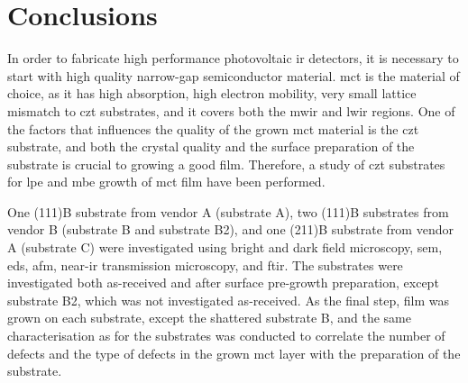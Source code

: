 \chapter{Conclusions}\label{ch:conclusion}

In order to fabricate high performance photovoltaic \ac{ir} detectors, it is necessary to start with high quality narrow-gap semiconductor material. \Ac{mct} is the material of choice, as it has high absorption, high electron mobility, very small lattice mismatch 
to \ac{czt} substrates, and it covers both the \ac{mwir} and \ac{lwir} regions. One of the factors that influences the quality of the grown \ac{mct} material is the \ac{czt} substrate, and both the crystal quality and the surface preparation of the substrate is crucial to growing a good film. Therefore, a study of \ac{czt} substrates for \ac{lpe} and \ac{mbe} growth of \ac{mct} film have been performed.

One (111)B substrate from vendor A (substrate A), two (111)B substrates from vendor B (substrate B and substrate B2), and one (211)B substrate from vendor A (substrate C) were investigated using bright and dark field microscopy, \ac{sem}, \ac{eds}, \ac{afm}, near-\ac{ir} transmission microscopy, and \ac{ftir}. The substrates were investigated both as-received and after surface pre-growth preparation, except substrate B2, which was not investigated as-received. As the final step,  film was grown on each substrate, except the shattered substrate B, and the same characterisation as for the substrates was conducted to correlate the number of defects and the type of defects in the grown \ac{mct} layer with the preparation of the substrate.

